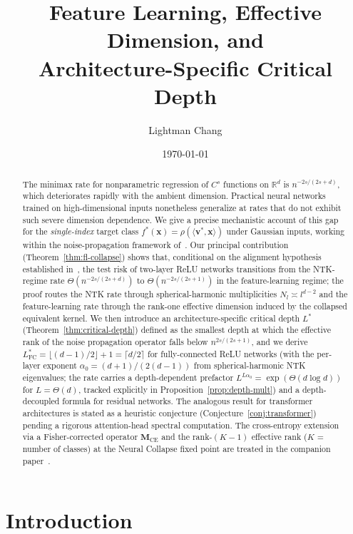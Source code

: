 \documentclass[12pt]{amsart}
\title[Feature Learning, Effective Dimension, and Critical Depth]{%
  Feature Learning, Effective Dimension, and\\
  Architecture-Specific Critical Depth}
\author{Lightman Chang}
\date{\today}
\theoremstyle{definition}
\theoremstyle{remark}
\newcommand{\R}{\mathbb{R}}
\newcommand{\bx}{\mathbf{x}}
\newcommand{\bM}{\mathbf{M}}
\newcommand{\bv}{\mathbf{v}}
\begin{document}
\begin{abstract}
The minimax rate for nonparametric regression of $C^{s}$ functions on
$\R^{d}$ is $n^{-2s/(2s+d)}$, which deteriorates rapidly with the ambient
dimension. Practical neural networks trained on high-dimensional inputs
nonetheless generalize at rates that do not exhibit such severe dimension
dependence. We give a precise mechanistic account of this gap for the
\emph{single-index} target class $f^{*}(\bx) = \rho(\langle \bv^{*}, \bx \rangle)$
under Gaussian inputs, working within the noise-propagation framework
of~\cite{paperA}. Our principal contribution (Theorem~\ref{thm:fl-collapse})
shows that, conditional on the alignment hypothesis established
in~\cite{paperB}, the test risk of two-layer ReLU networks transitions from
the NTK-regime rate $\Theta(n^{-2s/(2s+d)})$ to
$\Theta(n^{-2s/(2s+1)})$ in the feature-learning regime; the proof routes
the NTK rate through spherical-harmonic multiplicities $N_{l} \asymp l^{d-2}$
and the feature-learning rate through the rank-one effective dimension
induced by the collapsed equivalent kernel. We then introduce an
architecture-specific critical depth $L^{*}$ (Theorem~\ref{thm:critical-depth})
defined as the smallest depth at which the effective rank of the noise
propagation operator falls below $n^{2s/(2s+1)}$, and we derive
$L^{*}_{\mathrm{FC}} = \lfloor(d-1)/2\rfloor + 1 = \lceil d/2 \rceil$
for fully-connected ReLU networks (with the per-layer exponent
$\alpha_{0} = (d+1)/(2(d-1))$ from spherical-harmonic NTK eigenvalues;
the rate carries a depth-dependent prefactor $L^{L\alpha_{0}} = \exp(\Theta(d \log d))$
for $L = \Theta(d)$, tracked explicitly in
Proposition~\ref{prop:depth-mult}) and a depth-decoupled formula
for residual networks. The
analogous result for transformer architectures is stated as a heuristic
conjecture (Conjecture~\ref{conj:transformer}) pending a rigorous
attention-head spectral computation. The cross-entropy extension via a
Fisher-corrected operator $\bM_{\mathrm{CE}}$ and the rank-$(K-1)$ effective
rank ($K$ = number of classes) at the Neural Collapse fixed point are
treated in the companion paper~\cite{paperD}.
\end{abstract}

\maketitle

\section{Introduction}\label{sec:intro}
\end{document}
